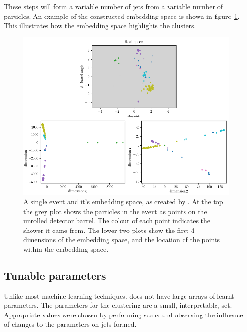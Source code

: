     These steps will form a variable number of jets from a variable number of particles.
    An example of the constructed embedding space is shown in figure~\ref{fig:embedding_space_simple}.
    This illustrates how the embedding space highlights the clusters.

    \begin{figure}[htp]
        \includegraphics[width=1\textwidth]{graphics/embedding_space_simple2.png}
        \caption{A single event and it's embedding space, as created by \spectral{}.
            At the top the grey plot shows the particles in the event as points on the unrolled detector barrel.
            The colour of each point indicates the shower it came from.
            The lower two plots show the first 4 dimensions of the embedding space,
            and the location of the points within the embedding space.
        }\label{fig:embedding_space_simple}
    \end{figure}    


\subsection{Tunable parameters}\label{sec:spectralmethodparam}
Unlike most machine learning techniques, \spectral{} does not have large arrays of learnt parameters.
The parameters for the clustering are a small, interpretable, set.
Appropriate values were chosen by performing scans and observing the influence of changes to the parameters on jets formed.

